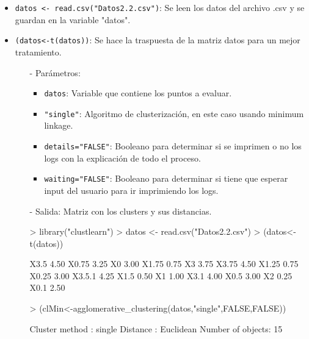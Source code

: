 \documentclass[a4paper, 12pt]{article}
\begin{document}
	\begin{itemize}
		\item \texttt{datos <- read.csv("Datos2.2.csv")}: Se leen los datos del archivo .csv y se guardan en la variable "datos".
		\item \texttt{(datos<-t(datos))}: Se hace la traspuesta de la matriz datos para un mejor tratamiento.
		\begin{itemize}
			\item [-] Parámetros:
			\begin{itemize}
				\item \texttt{datos}: Variable que contiene los puntos a evaluar.
				\item \texttt{"single"}: Algoritmo de clusterización, en este caso usando minimum linkage.
				\item \texttt{details="FALSE"}: Booleano para determinar si se imprimen o no los logs con la explicación de todo el proceso.
				\item \texttt{waiting="FALSE"}: Booleano para determinar si tiene que esperar input del usuario para ir imprimiendo los logs.
			\end{itemize}
			\item [-] Salida: Matriz con los clusters y sus distancias.
\begin{Schunk}
\begin{Sinput}
> library("clustlearn")
> datos <- read.csv("Datos2.2.csv")
> (datos<-t(datos))
\end{Sinput}
\begin{Soutput}
       [,1]
X3.5   4.50
X0.75  3.25
X0     3.00
X1.75  0.75
X3     3.75
X3.75  4.50
X1.25  0.75
X0.25  3.00
X3.5.1 4.25
X1.5   0.50
X1     1.00
X3.1   4.00
X0.5   3.00
X2     0.25
X0.1   2.50
\end{Soutput}
\begin{Sinput}
> (clMin<-agglomerative_clustering(datos,"single",FALSE,FALSE))
\end{Sinput}
\begin{Soutput}
Cluster method   : single 
Distance         : Euclidean 
Number of objects: 15 
\end{Soutput}
\end{Schunk}
		\end{itemize}


\end{itemize}
\end{document}
